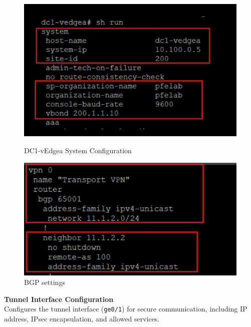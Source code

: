 \documentclass[12pt,english]{report}
\begin{document}
\begin{figure}[H]
    \begin{minipage}[b]{0.48\textwidth} %
        \centering
        \includegraphics[width=\textwidth]{chapitre 3/27.png}
        \caption{DC1-vEdgea System Configuration}
        \label{fig:DC1-vEdgea System Configuration}
    \end{minipage}
    \hfill %
    \begin{minipage}[b]{0.48\textwidth} %
        \centering
        \includegraphics[width=\textwidth]{chapitre 3/28.1.png}
        \caption{BGP settings}
        \label{fig:BGP settings}
    \end{minipage}
\end{figure}  
    \item \textbf{Tunnel Interface Configuration} \\
    Configures the tunnel interface (\texttt{ge0/1}) for secure communication, including IP address, IPsec encapsulation, and allowed services.
\end{document}

